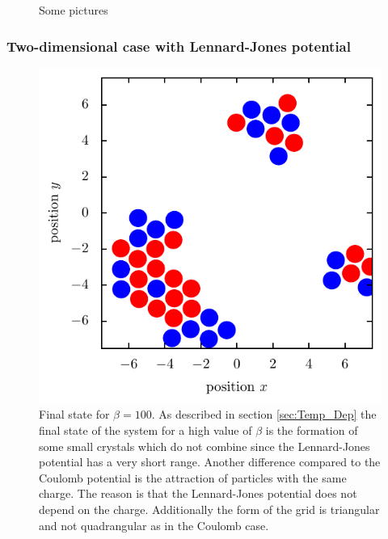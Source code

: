 \documentclass[11pt, a4paper]{article}
\numberwithin{equation}{section}
\begin{document}
\begin{figure}[p]
\begin{subfigure}[t]{0.49\textwidth}
	\end{subfigure}
	\caption{Some pictures}	
\end{figure}




\subsubsection{Two-dimensional case with Lennard-Jones potential}

\begin{figure}[!h]
\centering
\includegraphics[scale=1]{figures/Beta_100_LJ.pdf}
\caption{Final state for $\beta = 100$.
As described in section \ref{sec:Temp_Dep} the final state of the system for a high value of $\beta$ is the formation of some small crystals which do not combine since the Lennard-Jones potential has a very short range.
Another difference compared to the Coulomb potential is the attraction of particles with the same charge.
The reason is that the Lennard-Jones potential does not depend on the charge.
Additionally the form of the grid is triangular and not quadrangular as in the Coulomb case.
}
\end{figure}
\end{document}
